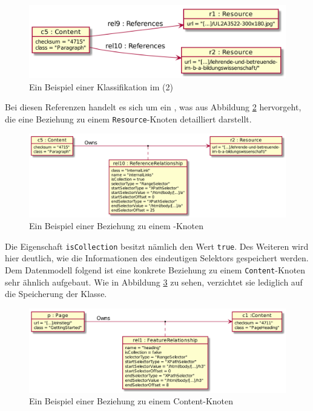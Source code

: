     \begin{figure}[htb]
        \centering
        \includegraphics[scale=\imageScalingFactor]{../resources/db-data-model/example/example_part2.png}
        \caption{Ein Beispiel einer Klassifikation im {\classificationStorage} (2)}
        \label{image:dbDataModelExampleOverviewPart2}
    \end{figure}

    Bei diesen Referenzen handelt es sich um ein {\collectionFeature},
    was aus Abbildung \ref{image:dbDataModelExampleRel10} hervorgeht,
    die eine Beziehung zu einem \texttt{Resource}-Knoten detailliert darstellt.

    \begin{figure}[htb]
        \centering
        \includegraphics[scale=\imageScalingFactor]{../resources/db-data-model/example/c5-r2.png}
        \caption{Ein Beispiel einer Beziehung zu einem {\resource}-Knoten}
        \label{image:dbDataModelExampleRel10}
    \end{figure}

    Die Eigenschaft \texttt{isCollection} besitzt nämlich den Wert \texttt{true}.
    Des Weiteren wird hier deutlich, wie die Informationen des eindeutigen Selektors gespeichert werden.
    Dem Datenmodell folgend ist eine konkrete Beziehung zu einem \texttt{Content}-Knoten
    sehr ähnlich aufgebaut. Wie in Abbildung \ref{image:dbDataModelExampleRel1} zu sehen,
    verzichtet sie lediglich auf die Speicherung der Klasse.

    \begin{figure}[htb]
        \centering
        \includegraphics[scale=\imageScalingFactor]{../resources/db-data-model/example/p-c1.png}
        \caption{Ein Beispiel einer Beziehung zu einem Content-Knoten}
        \label{image:dbDataModelExampleRel1}
    \end{figure}
